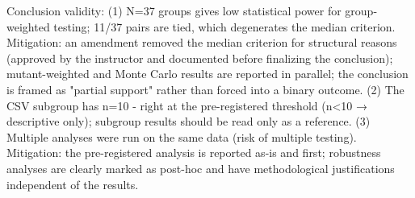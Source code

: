 Conclusion validity: (1) N=37 groups gives low statistical power for group-weighted testing; 11/37 pairs are tied, which degenerates the median criterion. Mitigation: an amendment removed the median criterion for structural reasons (approved by the instructor and documented before finalizing the conclusion); mutant-weighted and Monte Carlo results are reported in parallel; the conclusion is framed as "partial support" rather than forced into a binary outcome. (2) The CSV subgroup has n=10 - right at the pre-registered threshold (n<10 → descriptive only); subgroup results should be read only as a reference. (3) Multiple analyses were run on the same data (risk of multiple testing). Mitigation: the pre-registered analysis is reported as-is and first; robustness analyses are clearly marked as post-hoc and have methodological justifications independent of the results.